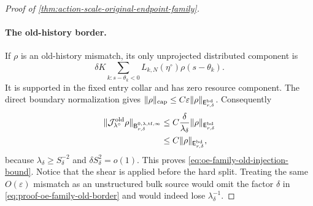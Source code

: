 \begin{proof}[Proof of
\cref{thm:action-scale-original-endpoint-family}]
\paragraph{The old-history border.}
If \(\rho\) is an old-history mismatch, its only unprojected distributed
component is
\[
 \delta K\sum_{k:s-\theta_k<0}
       L_{k,N}(\eta^\circ)\rho(s-\theta_k).
\]
It is supported in the fixed entry collar and has zero resource component.
The direct boundary normalization gives
\(\|\rho\|_{\rm cap}\le
C\varepsilon\|\rho\|_{\mathsf E_{r,\delta}^{\rm bd}}\).
Consequently
\begin{align}
 \|\mathcal J_{\lambda^\circ}^{\rm old}\rho\|_
  {\mathsf B_{r,\delta}^{0,\lambda,\mathrm{tf},\infty}}
 &\le
 C\frac{\delta}{\lambda_\delta}
       \|\rho\|_{\mathsf E_{r,\delta}^{\rm bd}}\notag\\
 &\le C\|\rho\|_{\mathsf E_{r,\delta}^{\rm bd}},           \label{eq:proof-oe-family-old-border}
\end{align}
because \(\lambda_\delta\ge S_\delta^{-2}\) and
\(\delta S_\delta^2=o(1)\).  This proves
\cref{eq:oe-family-old-injection-bound}.  Notice that the shear is applied
before the hard split.  Treating the same \(O(\varepsilon)\) mismatch as an
unstructured bulk source would omit the factor \(\delta\) in
\cref{eq:proof-oe-family-old-border} and would indeed lose
\(\lambda_\delta^{-1}\).


\end{proof}
